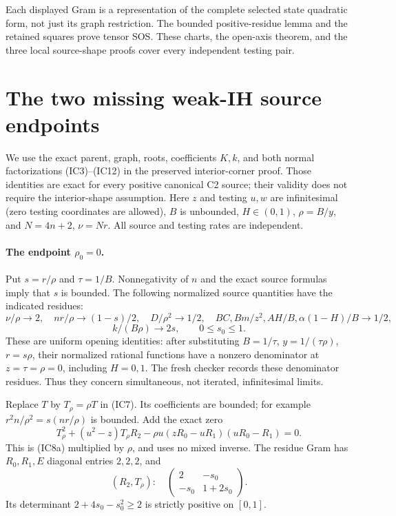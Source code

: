 Each displayed Gram is a representation of the complete selected
state quadratic form, not just its graph restriction. The bounded
positive-residue lemma and the retained squares prove tensor SOS.
These charts, the open-axis theorem, and the three local source-shape
proofs cover every independent testing pair.


\section{\texorpdfstring{The two missing weak-IH source endpoints}{The two missing weak-IH source endpoints}}
\label{component:p18dbedfff317}

\label{p18dbedfff317:sec:weak-ih-endpoints}
We use the exact parent, graph, roots, coefficients $K,k$, and both
normal factorizations (IC3)--(IC12) in the preserved interior-corner
proof.  Those identities are exact for every positive canonical C2
source; their validity does not require the interior-shape assumption.
Here $z$ and testing $u,w$ are infinitesimal (zero testing coordinates
are allowed), $B$ is unbounded, $H\in(0,1)$, $\rho=B/y$, and
$N=4n+2$, $\nu=Nr$. All source and testing rates are independent.

\paragraph{The endpoint $\rho_0=0$.}
Put $s=r/\rho$ and $\tau=1/B$. Nonnegativity of $n$ and the exact
source formulas imply that $s$ is bounded. The following normalized
source quantities have the indicated residues:
\[
 \nu/\rho\to2,\quad nr/\rho\to(1-s)/2,\quad
 D/\rho^2\to1/2,\quad BC,Bm/z^2,AH/B,\alpha(1-H)/B\to1/2,
\]
\[
 k/(B\rho)\to2s,\qquad 0\le s_0\le1.
\tag{WIE1}
\]
These are uniform opening identities: after substituting
$B=1/\tau$, $y=1/(\tau\rho)$, $r=s\rho$, their normalized rational
functions have a nonzero denominator at $z=\tau=\rho=0$, including
$H=0,1$. The fresh checker records these denominator residues.
Thus they concern simultaneous, not iterated, infinitesimal limits.

Replace $T$ by $T_\rho=\rho T$ in (IC7). Its coefficients are bounded;
for example $r^2n/\rho^2=s(nr/\rho)$ is bounded. Add the exact zero
\[
 T_\rho^2+(u^2-z)T_\rho R_2
 -\rho u(zR_0-uR_1)(uR_0-R_1)=0.
\tag{WIE2}
\]
This is (IC8a) multiplied by $\rho$, and uses no mixed inverse.
The residue Gram has $R_0,R_1,E$ diagonal entries $2,2,2$, and
\[
 (R_2,T_\rho):\quad
 \begin{pmatrix}2&-s_0\\-s_0&1+2s_0\end{pmatrix}.
\]
Its determinant $2+4s_0-s_0^2\ge2$ is strictly positive on $[0,1]$.

